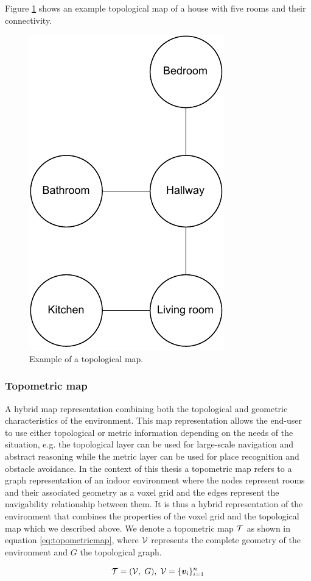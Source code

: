 Figure \ref{fig:topomap} shows an example topological map of a house with five rooms and their connectivity.

\begin{figure}[h]
    \centering
    \includegraphics*[width=.3\textwidth]{./fig/topological_map.pdf}
    \caption{Example of a topological map.}
    \label{fig:topomap}
\end{figure}

\pagebreak

\subsubsection{Topometric map}
A hybrid map representation combining both the topological and geometric characteristics of the environment. This map representation allows the end-user to use either topological or metric information depending on the needs of the situation, e.g. the topological layer can be used for large-scale navigation and abstract reasoning while the metric layer can be used for place recognition and obstacle avoidance. In the context of this thesis a topometric map refers to a graph representation of an indoor environment where the nodes represent rooms and their associated geometry as a voxel grid and the edges represent the navigability relationship between them. It is thus a hybrid representation of the environment that combines the properties of the voxel grid and the topological map which we described above. We denote a topometric map \(\mathcal{T}\) as shown in equation \ref{eq:topometricmap}, where \(\mathcal{V}\) represents the complete geometry of the environment and \(G\) the topological graph.

\begin{equation}
    \label{eq:topometricmap}
    \topometricmap = (\voxelgrid,\ G),\ \voxelgrid=\{\voxel_{i}\}_{i=1}^{n}
\end{equation}

